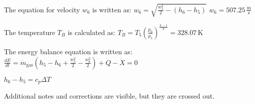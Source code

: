 The equation for velocity \( w_6 \) is written as:  
\( w_6 = \sqrt{\frac{w_5^2}{2} - (h_6 - h_5)} \)  
\( w_6 = 507.25 \, \frac{\text{m}}{\text{s}} \)  

The temperature \( T_B \) is calculated as:  
\( T_B = T_5 \left( \frac{p_0}{p_5} \right)^{\frac{k-1}{k}} = 328.07 \, \text{K} \)  

The energy balance equation is written as:  
\( \frac{dE}{dt} = \dot{m}_{\text{gas}} (h_5 - h_6 + \frac{w_5^2}{2} - \frac{w_6^2}{2}) + \dot{Q} - \dot{X} = 0 \)  

\( h_6 - h_5 = c_p \Delta T \)  

Additional notes and corrections are visible, but they are crossed out.